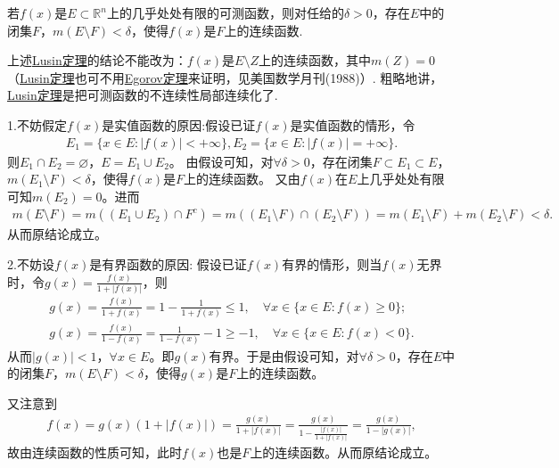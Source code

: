 \documentclass[../../main.tex]{subfiles}%
\begin{document}
\begin{theorem}[Lusin(卢津)定理]\label{theorem:Lusin(卢津)定理}
若\(f(x)\)是\(E \subset \mathbb{R}^{n}\)上的几乎处处有限的可测函数，则对任给的\(\delta > 0\)，存在\(E\)中的闭集\(F\)，\(m(E \setminus F) < \delta\)，使得\(f(x)\)是\(F\)上的连续函数.
\end{theorem}
\begin{remark}
上述\hyperref[theorem:Lusin(卢津)定理]{Lusin定理}的结论不能改为：\(f(x)\)是\(E \setminus Z\)上的连续函数，其中\(m(Z) = 0\)（\hyperref[theorem:Lusin(卢津)定理]{Lusin定理}也可不用\hyperref[theorem:Egorov定理]{Egorov定理}来证明，见美国数学月刊(1988)）. 粗略地讲，\hyperref[theorem:Lusin(卢津)定理]{Lusin定理}是把可测函数的不连续性局部连续化了. 
\end{remark}
\begin{remark}
1.\hypertarget{不妨假定f是实值函数的原因}{不妨假定}\(f(x)\)是实值函数的原因:假设已证\(f(x)\)是实值函数的情形，令
\begin{align*}
E_1 = \{x \in E : |f(x)| < +\infty\},E_2 = \{x \in E : |f(x)| = +\infty\}.
\end{align*}
则\(E_1 \cap E_2 = \varnothing\)，\(E = E_1 \cup E_2\)。
由假设可知，对\(\forall \delta > 0\)，存在闭集\(F \subset E_1 \subset E\)，\(m(E_1 \setminus F) < \delta\)，使得\(f(x)\)是\(F\)上的连续函数。
又由\(f(x)\)在\(E\)上几乎处处有限可知\(m(E_2) = 0\)。进而
\begin{align*}
m(E \setminus F) = m((E_1 \cup E_2) \cap F^c) 
= m((E_1 \setminus F) \cap (E_2 \setminus F)) 
= m(E_1 \setminus F) + m(E_2 \setminus F) 
< \delta.
\end{align*}
从而原结论成立。

2.\hypertarget{不妨设f有界的原因}{不妨设$f(x)$是有界函数的原因:} 假设已证\(f(x)\)有界的情形，则当\(f(x)\)无界时，令\(g(x) = \frac{f(x)}{1 + |f(x)|}\)，则
\begin{align*}
g(x) = \frac{f(x)}{1 + f(x)} = 1 - \frac{1}{1 + f(x)} \leqslant 1, \quad \forall x \in \{x \in E : f(x) \geqslant 0\}; \\
g(x) = \frac{f(x)}{1 - f(x)} = \frac{1}{1 - f(x)} - 1 \geqslant -1, \quad \forall x \in \{x \in E : f(x) < 0\}.
\end{align*}
从而\(|g(x)| < 1\)，\(\forall x \in E\)。即\(g(x)\)有界。于是由假设可知，对\(\forall \delta > 0\)，存在\(E\)中的闭集\(F\)，\(m(E \setminus F) < \delta\)，使得\(g(x)\)是\(F\)上的连续函数。

又注意到
\begin{align*}
f(x) = g(x)(1 + |f(x)|) = \frac{g(x)}{1 + |f(x)|} = \frac{g(x)}{1 - \frac{|f(x)|}{1 + |f(x)|}} = \frac{g(x)}{1 - |g(x)|},
\end{align*}
故由连续函数的性质可知，此时\(f(x)\)也是\(F\)上的连续函数。从而原结论成立。
\end{remark}
\end{document}
